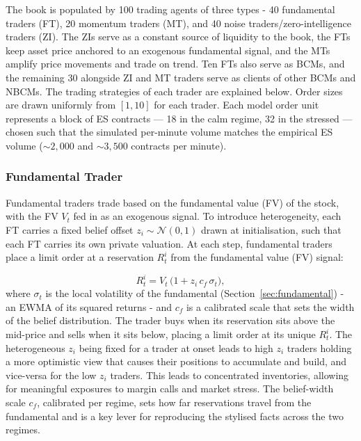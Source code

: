 The book is populated by 100 trading agents of three types - 40 fundamental traders (FT), 20 momentum traders (MT), and 40 noise traders/zero-intelligence traders (ZI). The ZIs serve as a constant source of liquidity to the book, the FTs keep asset price anchored to an exogenous fundamental signal, and the MTs amplify price movements and trade on trend. Ten FTs also serve as BCMs, and the remaining 30 alongside ZI and MT traders serve as clients of other BCMs and NBCMs. The trading strategies of each trader are explained below.  Order sizes are drawn uniformly from $[1, 10]$ for each trader. Each model order unit represents a block of ES contracts — 18 in the calm regime, 32 in the stressed — chosen such that the simulated per-minute volume matches the empirical ES volume ($\sim2,000$ and $\sim3,500$ contracts per minute).

\subsubsection{Fundamental Trader}

Fundamental traders trade based on the fundamental value (FV) of the stock, with the FV $V_t$ fed in as an exogenous signal. To introduce heterogeneity, each FT carries a fixed belief offset $z_i \sim \mathcal{N}(0,1)$ drawn at initialisation, such that each FT carries its own private valuation. At each step, fundamental traders place a limit order at a reservation $R^{i}_t$ from the fundamental value (FV) signal: 

\begin{equation}
  R^{i}_t = V_t\,\big(1 + z_i\,c_f\,\sigma_t\big),
\end{equation}
where $\sigma_t$ is the local volatility of the fundamental (Section~\ref{sec:fundamental}) - an EWMA of its squared returns - and
$c_f$ is a calibrated scale that sets the width of the belief
distribution.
The trader buys when its reservation sits above the mid-price and sells when it sits below, placing a limit order at its unique $R^{i}_t$. The heterogeneous $z_i$ being fixed for a trader at onset leads to high $z_i$ traders holding a more optimistic view that causes their positions to accumulate and build, and vice-versa for the low $z_i$ traders. This leads to concentrated inventories, allowing for meaningful exposures to margin calls and market stress. The belief-width scale $c_f$, calibrated per regime, sets how far reservations travel from the
fundamental and is a key lever for reproducing the stylised facts across the two regimes.


